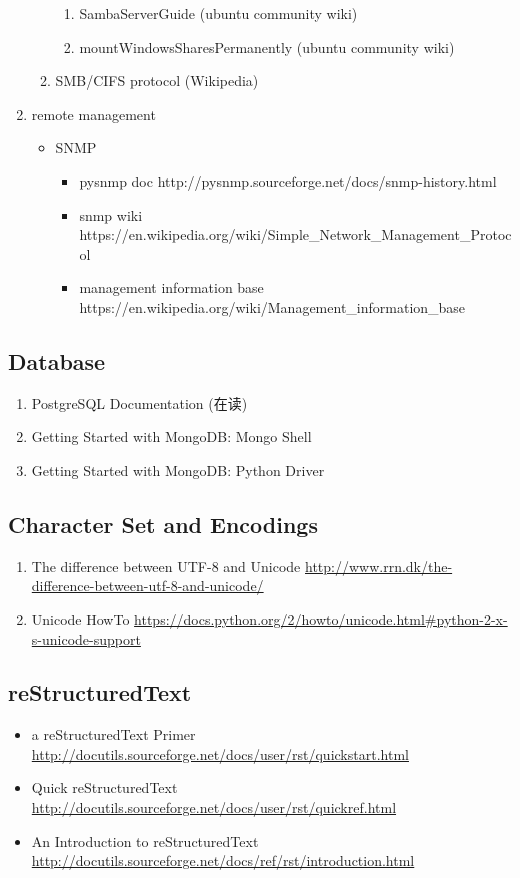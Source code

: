 \documentclass{article}
\begin{document}
\begin{enumerate}
\begin{enumerate}
\begin{enumerate}
                    \item SambaServerGuide (ubuntu community wiki)
                    \item mountWindowsSharesPermanently (ubuntu community wiki)
                \end{enumerate}
            \item SMB/CIFS protocol (Wikipedia)
        \end{enumerate}
    \item remote management
        \begin{itemize}
            \item SNMP
                \begin{itemize}
                    \item pysnmp doc http://pysnmp.sourceforge.net/docs/snmp-history.html
                    \item snmp wiki https://en.wikipedia.org/wiki/Simple_Network_Management_Protocol
                    \item management information base https://en.wikipedia.org/wiki/Management_information_base
                \end{itemize}
        \end{itemize}
\end{enumerate}
\subsection{Database}
\begin{enumerate}
    \item PostgreSQL Documentation (在读)
    \item Getting Started with MongoDB: Mongo Shell
    \item Getting Started with MongoDB: Python Driver
\end{enumerate}
\subsection{Character Set and Encodings}
\begin{enumerate}
    \item The difference between UTF-8 and Unicode \url{http://www.rrn.dk/the-difference-between-utf-8-and-unicode/}
    \item Unicode HowTo \url{https://docs.python.org/2/howto/unicode.html#python-2-x-s-unicode-support}
\end{enumerate}
%
\subsection{reStructuredText}
\begin{itemize}
    \item a reStructuredText Primer \url{http://docutils.sourceforge.net/docs/user/rst/quickstart.html}
    \item Quick reStructuredText \url{http://docutils.sourceforge.net/docs/user/rst/quickref.html}
    \item An Introduction to reStructuredText \url{http://docutils.sourceforge.net/docs/ref/rst/introduction.html}
\end{itemize}
%
\end{document}
